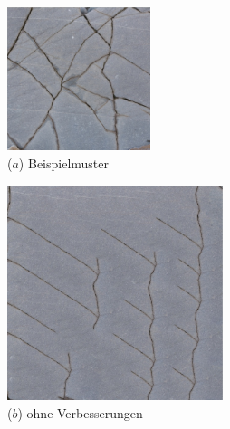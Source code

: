 \begin{figure}
\centering
\begin{subfigure}{0.9\textwidth}
	\centering
	\begin{subfigure}{0.3\textwidth}
		\centering
		\includegraphics[width=0.6\textwidth]{images/example-1-example}
		\caption*{($a$) Beispielmuster}
	\end{subfigure}
	\hfill
	\begin{subfigure}{0.3\textwidth}
		\centering
		\includegraphics[width=0.9\textwidth]{images/example-1-without}
		\caption*{($b$) ohne Verbesserungen}
	\end{subfigure}
	\hfill
	\begin{subfigure}{0.3\textwidth}
		\centering

\end{subfigure}
\end{subfigure}
\end{figure}
